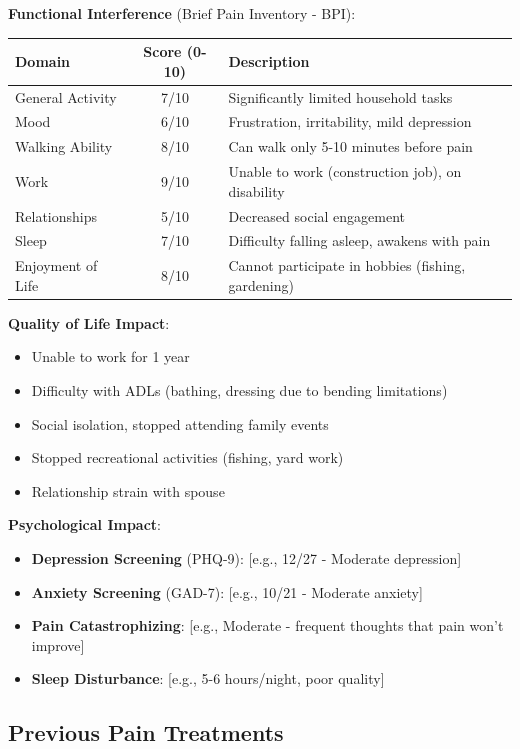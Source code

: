 \documentclass[11pt,letterpaper]{article}
\begin{document}
\textbf{Functional Interference} (Brief Pain Inventory - BPI):

\begin{tabularx}{\textwidth}{|l|c|X|}
\hline
\textbf{Domain} & \textbf{Score (0-10)} & \textbf{Description} \\ \hline
General Activity & 7/10 & Significantly limited household tasks \\ \hline
Mood & 6/10 & Frustration, irritability, mild depression \\ \hline
Walking Ability & 8/10 & Can walk only 5-10 minutes before pain \\ \hline
Work & 9/10 & Unable to work (construction job), on disability \\ \hline
Relationships & 5/10 & Decreased social engagement \\ \hline
Sleep & 7/10 & Difficulty falling asleep, awakens with pain \\ \hline
Enjoyment of Life & 8/10 & Cannot participate in hobbies (fishing, gardening) \\ \hline
\end{tabularx}

\textbf{Quality of Life Impact}:
\begin{itemize}[leftmargin=*]
    \item Unable to work for 1 year
    \item Difficulty with ADLs (bathing, dressing due to bending limitations)
    \item Social isolation, stopped attending family events
    \item Stopped recreational activities (fishing, yard work)
    \item Relationship strain with spouse
\end{itemize}

\textbf{Psychological Impact}:
\begin{itemize}[leftmargin=*]
    \item \textbf{Depression Screening} (PHQ-9): [e.g., 12/27 - Moderate depression]
    \item \textbf{Anxiety Screening} (GAD-7): [e.g., 10/21 - Moderate anxiety]
    \item \textbf{Pain Catastrophizing}: [e.g., Moderate - frequent thoughts that pain won't improve]
    \item \textbf{Sleep Disturbance}: [e.g., 5-6 hours/night, poor quality]
\end{itemize}

\subsection*{Previous Pain Treatments}
\end{document}
